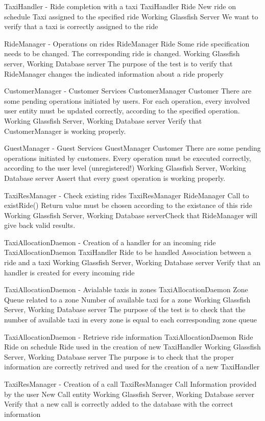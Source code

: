 \testx
{TaxiHandler - Ride completion with a taxi}
{TaxiHandler}
{Ride}
{New ride on schedule}
{Taxi assigned to the specified ride}
{Working Glassfish Server}
{We want to verify that a taxi is correctly assigned to the ride}

\testx
{RideManager - Operations on rides}
{RideManager}
{Ride}
{ Some ride specification needs to be changed. }
{ The corresponding ride is changed. }
{ Working Glassfish server, Working Database server }
{The purpose of the test is to verify that RideManager changes the indicated information about a ride properly }

\testx
{CustomerManager - Customer Services}
{CustomerManager}
{Customer}
{There are some pending operations initiated by users.}
{For each operation, every involved user entity must be updated correctly, according to the specified operation.}
{Working Glassfish Server, Working Database server}
{Verify that CustomerManager is working properly.}

\testx
{GuestManager - Guest Services}
{GuestManager}
{Customer}
{There are some pending operations initiated by customers.}
{ Every operation must be executed correctly, according to the user level (unregistered!)}
{Working Glassfish Server, Working Database server}
{Assert that every guest operation is working properly.}

\testx
{TaxiResManager - Check existing rides}
{TaxiResManager}
{RideManager}
{Call to existRide()}
{Return value must be chosen according to the existance of this ride}
{Working Glassfish Server, Working Database server}{Check that RideManager will give back valid results.}

\testx
{TaxiAllocationDaemon - Creation of a handler for an incoming ride}
{TaxiAllocationDaemon}
{TaxiHandler}
{Ride to be handled}
{Association between a ride and a taxi}
{Working Glassfish Server, Working Database server}
{Verify that an handler is created for every incoming ride}

\testx
{TaxiAllocationDaemon - Avialable taxis in zones}
{TaxiAllocationDaemon}
{Zone}
{Queue related to a zone}
{Number of available taxi for a zone}
{Working Glassfish Server, Working Database server}
{The purpose of the test is to check that the number of available taxi in every zone is equal to each corresponding zone queue}

\testx
{TaxiAllocationDaemon - Retrieve ride information}
{TaxiAllocationDaemon}
{Ride}
{Ride on schedule}
{Ride used in the creation of  new TaxiHandler}
{Working Glassfish Server, Working Database server}
{The purpose is to check that the proper information are correctly retrived and used for the creation of a new TaxiHandler}

\testx
{TaxiResManager - Creation of a call}
{TaxiResManager}
{Call}
{Information provided by the user}
{New Call entity}
{Working Glassfish Server, Working Database server}
{Verify that a new call is correctly added to the database with the correct information}
